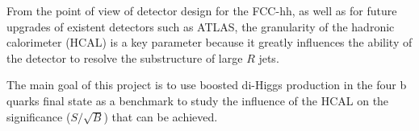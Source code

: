 From the point of view of detector design for the FCC-hh, as well as for future upgrades of existent detectors such as ATLAS, the granularity of the hadronic calorimeter (HCAL) is a key parameter because it greatly influences the ability of the detector to resolve the substructure of large $R$ jets. 

The main goal of this project is to use boosted di-Higgs production in the four b quarks final state as a benchmark to study the influence of the HCAL on the significance ($S/\sqrt{B}$) that can be achieved.  
